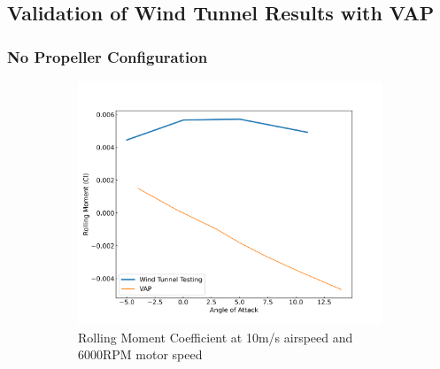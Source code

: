 
       

\subsection{Validation of Wind Tunnel Results with VAP}


\subsubsection{No Propeller Configuration}


\begin{figure}[H]
    \centering
    \begin{subfigure}[b]{0.467\textwidth}
        \centering
        \includegraphics[width=\textwidth]{05_Results/VAP/noProp/Cl/10ms_6000RPM_Cl.png}
        \caption{Rolling Moment Coefficient at 10m/s airspeed and 6000RPM motor speed}
        \label{fig:VAP_NoProp_Cl_10ms_6000}
    \end{subfigure}
    \begin{subfigure}[b]{0.467\textwidth}
        \centering

\end{subfigure}
\end{figure}
